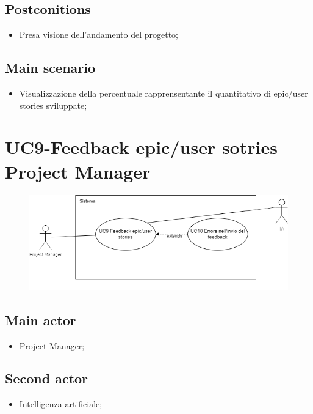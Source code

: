 \documentclass{article}
\begin{document}
    \subsection*{Postconitions}
        \begin{itemize}
            \item Presa visione dell'andamento del progetto;
        \end{itemize}
        
    \subsection*{Main scenario}
        
        \begin{itemize}
            \item Visualizzazione della percentuale rapprensentante il quantitativo di epic/user stories sviluppate;
        \end{itemize}
        

\section{UC9-Feedback epic/user sotries Project Manager}
    \begin{figure}[h]
      \centering
      \includegraphics{documenti/imgUML/UC9.png}
      \label{fig:immagine}
    \end{figure}
    \subsection*{Main actor}
    \begin{itemize}
        \item Project Manager;
    \end{itemize}
    \subsection{Second actor}
    \begin{itemize}
        \item Intelligenza artificiale;
    \end{itemize}
    
\end{document}
